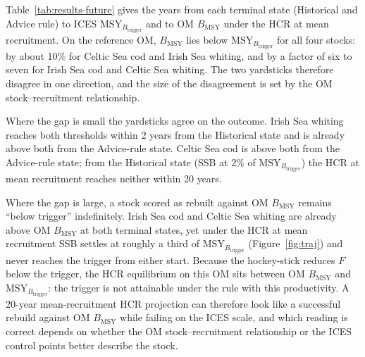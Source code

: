 \documentclass[11pt,a4paper]{article}
\newcommand{\Btrig}{\mathrm{MSY}_{B_{\mathrm{trigger}}}}
\newcommand{\Bmsy}{B_{\mathrm{MSY}}}
\begin{document}
Table~\ref{tab:results-future} gives the years from each terminal state
(Historical and Advice rule) to ICES $\Btrig$ and to OM $\Bmsy$ under the
HCR at mean recruitment. On the reference OM, $\Bmsy$ lies below
$\Btrig$ for all four stocks: by about 10\% for Celtic Sea cod and
Irish Sea whiting, and by a factor of six to seven for Irish Sea cod
and Celtic Sea whiting. The two yardsticks therefore disagree in one
direction, and the size of the disagreement is set by the OM
stock--recruitment relationship.

Where the gap is small the yardsticks agree on the outcome. Irish Sea
whiting reaches both thresholds within 2 years from the Historical
state and is already above both from the Advice-rule state. Celtic Sea
cod is above both from the Advice-rule state; from the Historical state
(SSB at 2\% of $\Btrig$) the HCR at mean recruitment reaches neither
within 20 years.

Where the gap is large, a stock scored as rebuilt against OM $\Bmsy$
remains ``below trigger'' indefinitely. Irish Sea cod and Celtic Sea
whiting are already above OM $\Bmsy$ at both terminal states, yet under
the HCR at mean recruitment SSB settles at roughly a third of $\Btrig$
(Figure~\ref{fig:traj}) and never reaches the trigger from either start.
Because the hockey-stick reduces $F$ below the trigger, the HCR
equilibrium on this OM sits between OM $\Bmsy$ and $\Btrig$: the
trigger is not attainable under the rule with this productivity. A
20-year mean-recruitment HCR projection can therefore look like a
successful rebuild against OM $\Bmsy$ while failing on the ICES scale,
and which reading is correct depends on whether the OM
stock--recruitment relationship or the ICES control points better
describe the stock.
\end{document}
